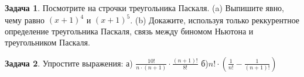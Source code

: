 \documentclass[a4paper,11pt]{article}%
\theoremstyle{definition}%
\newtheorem{Ex}{\hspace{-25pt}\fbox{\phantom{123}} Задача}%
\begin{document}
%
\iffalse%
Автор: Дарья Анзон%
Дата: 01.07.2017%
Название: None%
Подсказка: \textbackslash{}\textbackslash{}%
nan%
\fi%
%
\begin{Ex}%
Посмотрите на строчки треугольника Паскаля.
(a) Выпишите явно, чему равно $(x + 1)^4$ и $(x + 1)^5$.
(b) Докажите, используя только реккурентное определение треугольника Паскаля, связь между биномом Ньютона и треугольником Паскаля.%
%
\end{Ex}%
%
\iffalse%
Автор: Павел Минаев%
Дата: 07.10.2017%
Название: None%
Подсказка: \textbackslash{}\textbackslash{}%
nan%
\fi%
%
\begin{Ex}%
Упростите выражения: а) $\frac{10 !}{n \cdot(n+1)} \cdot  \frac{(n+1) !}{8 !}$ б)$n ! \cdot\left(\frac{1}{n !}-\frac{1}{(n+1) !}\right)$%
%
\end{Ex}%
%
\iffalse%
Автор: Дарья Анзон%
Дата: 01.07.2017%
Название: None%
Подсказка: \textbackslash{}\textbackslash{}%
nan%
\fi%
%
\end{document}
